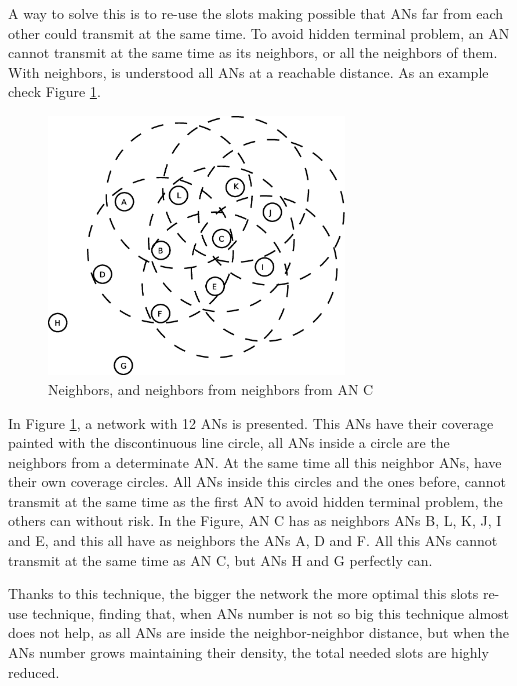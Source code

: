 A way to solve this is to re-use the slots making possible that \acp{AN} far from each other could transmit at the same time. To avoid hidden terminal 
problem, an \ac{AN} cannot transmit at the same time as its neighbors, or all the neighbors of them. With neighbors, is understood all \acp{AN} at a 
reachable distance. As an example check Figure \ref{fig:ejemplonetslots}.

\begin{figure}[ht]
 \begin{center}
  \includegraphics[width=0.7\textwidth]{ejemplonetslots.eps}
 \end{center}
 \caption{Neighbors, and neighbors from neighbors from \ac{AN} C}
 \label{fig:ejemplonetslots}
\end{figure}

In Figure \ref{fig:ejemplonetslots}, a network with 12 \acp{AN} is presented. This \acp{AN} have their coverage painted with the discontinuous line circle,
all \acp{AN} inside a circle are the neighbors from a determinate \ac{AN}. At the same time all this neighbor \acp{AN}, have their own coverage circles.
All \acp{AN} inside this circles and the ones before, cannot transmit at the same time as the first \ac{AN} to avoid hidden terminal problem, the others 
can without risk. In the Figure, \ac{AN} C has as neighbors \acp{AN} B, L, K, J, I and E, and this all have as neighbors the \acp{AN} A, D and F. All this
\acp{AN} cannot transmit at the same time as \ac{AN} C, but \acp{AN} H and G perfectly can.

Thanks to this technique, the bigger the network the more optimal this slots re-use technique, finding that, when \acp{AN} number is not so big this 
technique almost does not help, as all \acp{AN} are inside the neighbor-neighbor distance, but when the \acp{AN} number grows maintaining their 
density, the total needed slots are highly reduced.

